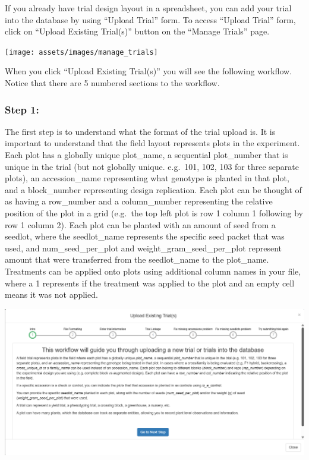 \documentclass[
  12pt,
]{book}
\begin{document}
If you already have trial design layout in a spreadsheet, you can add your trial into the database by using ``Upload Trial'' form. To access ``Upload Trial'' form, click on ``Upload Existing Trial(s)'' button on the ``Manage Trials'' page.

\begin{center}\texttt{[image: assets/images/manage\_trials]} \end{center}

When you click ``Upload Existing Trial(s)'' you will see the following workflow. Notice that there are 5 numbered sections to the workflow.

\hypertarget{step-1}{%
\subsubsection*{Step 1:}\label{step-1}}


The first step is to understand what the format of the trial upload is. It is important to understand that the field layout represents plots in the experiment. Each plot has a globally unique plot\_name, a sequential plot\_number that is unique in the trial (but not globally unique. e.g.~101, 102, 103 for three separate plots), an accession\_name representing what genotype is planted in that plot, and a block\_number representing design replication. Each plot can be thought of as having a row\_number and a column\_number representing the relative position of the plot in a grid (e.g.~the top left plot is row 1 column 1 following by row 1 column 2). Each plot can be planted with an amount of seed from a seedlot, where the seedlot\_name represents the specific seed packet that was used, and num\_seed\_per\_plot and weight\_gram\_seed\_per\_plot represent amount that were transferred from the seedlot\_name to the plot\_name. Treatments can be applied onto plots using additional column names in your file, where a 1 represents if the treatment was applied to the plot and an empty cell means it was not applied.

\begin{center}\includegraphics[width=0.95\linewidth]{assets/images/manage_trials_upload_trial_1} \end{center}
\end{document}
